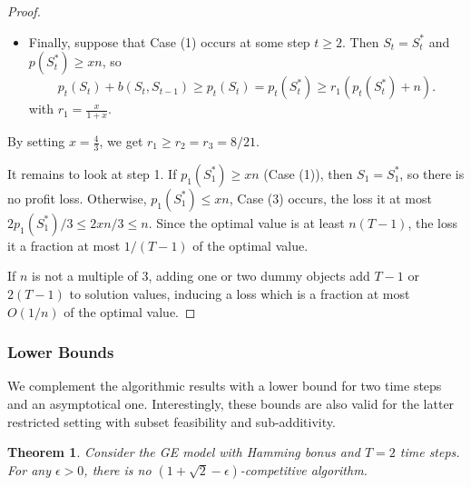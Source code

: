 \documentclass[a4paper]{book}
\newtheorem{theorem}{Theorem}[chapter]
\newtheorem{proof}{\noindent{\bf Proof.} }
\newcommand{\finalversion}[1]{#1}
\begin{document}
\begin{proof}
\begin{itemize}
\item Finally, suppose that Case (1) occurs at some step $t\geq 2$. Then $S_t=S^*_t$ and $p(S^*_t)\geq xn$, so 
\begin{equation}\nonumber
    p_t(S_t)+b(S_t,S_{t-1})\geq  p_t(S_t) = p_t(S^*_t)\geq r_1(p_t(S^*_t)+n).
\end{equation}
with $r_1=\frac{x}{1+x}$.
\end{itemize}
By setting $x=\frac{4}{3}$, we get $r_1\geq r_2=r_3=8/21$.

It remains to look at step 1. If $p_1(S^*_1)\geq xn$ (Case (1)), then $S_1=S^*_1$, so there is no profit loss. Otherwise, $p_1(S^*_1)\leq xn$, Case (3) occurs, the loss it at most $2p_1(S^*_1)/3\leq 2xn/3\leq n$. Since the optimal value is at least $n(T-1)$, the loss it a fraction at most $1/(T-1)$ of the optimal value.

If $n$ is not a multiple of 3, adding one or two dummy objects add $T-1$ or $2(T-1)$ to solution values, inducing a loss which is a fraction at most $O(1/n)$ of the optimal value. %
\end{proof}


\subsubsection{Lower Bounds}\label{sub:generallower}

We complement the algorithmic results with a lower bound for two time steps and an asymptotical one. Interestingly, these bounds are also valid for the latter restricted setting with subset feasibility and \finalversion{sub-additivity}.

\begin{theorem}\label{thm:general-hamming-lower}
Consider the GE model with Hamming bonus \finalversion{and $T=2$ time steps}. For any $\epsilon>0$, there is no $(1+\sqrt{2}-\epsilon)$-competitive algorithm.%
\end{theorem}
\end{document}
